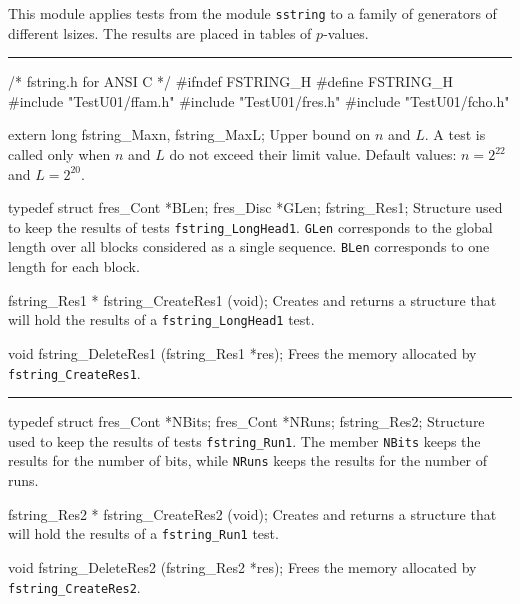 
This module applies tests from the module {\tt sstring}
to a family of generators of different lsizes.
The results are placed in tables of $p$-values.

\bigskip
\hrule
\code\hide
/* fstring.h for ANSI C */
#ifndef FSTRING_H
#define FSTRING_H
\endhide
#include "TestU01/ffam.h"
#include "TestU01/fres.h"
#include "TestU01/fcho.h"


extern long fstring_Maxn, fstring_MaxL;
\endcode
\tab
  Upper bound on $n$ and $L$.
  A test is called only when $n$ and $L$ do not exceed their limit value.
  Default values: $n = 2^{22}$ and $L = 2^{20}$.
\endtab


\ifdetailed  %


\code

typedef struct {
   fres_Cont *BLen;
   fres_Disc *GLen;
} fstring_Res1;
\endcode
 \tab  Structure used to keep the results of tests
  {\tt fstring\_LongHead1}. {\tt GLen} corresponds to the global length
  over all blocks considered as a single sequence. {\tt BLen} corresponds
  to one length for each block.
 \endtab
\code


fstring_Res1 * fstring_CreateRes1 (void);
\endcode
 \tab
  Creates and returns a structure that will hold the results
  of a  {\tt fstring\_LongHead1} test.
 \endtab
\code


void fstring_DeleteRes1 (fstring_Res1 *res);
\endcode
 \tab
  Frees the memory allocated by {\tt fstring\_CreateRes1}.
 \endtab
\bigskip\hrule\bigskip
\code

typedef struct {
   fres_Cont *NBits;
   fres_Cont *NRuns;
} fstring_Res2;
\endcode
 \tab  Structure used to keep the results of tests {\tt fstring\_Run1}.
  The member {\tt NBits} keeps the results for the number of
   bits, while {\tt NRuns} keeps the results for the number of runs.
 \endtab
\code


fstring_Res2 * fstring_CreateRes2 (void);
\endcode
 \tab
  Creates and returns a structure that will hold the results
  of a  {\tt fstring\_Run1} test.
 \endtab
\code


void fstring_DeleteRes2 (fstring_Res2 *res);
\endcode
 \tab
  Frees the memory allocated by {\tt fstring\_CreateRes2}.
 \endtab

\fi %




\code

